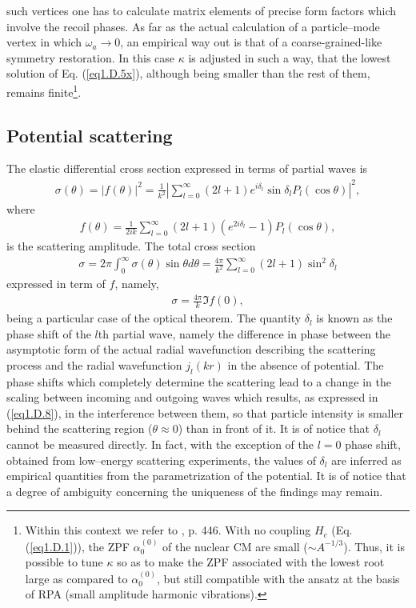 \begin{subappendices}
such vertices one has to calculate matrix elements of precise form factors which involve the recoil phases. As far as the actual calculation of a particle--mode vertex in which $\omega_a\rightarrow 0$, an empirical
way out is that of a coarse-grained-like symmetry restoration.
In this case $\kappa$ is adjusted in such a way, that the lowest solution of Eq. (\ref{eq1.D.5x}), although
being smaller than the  rest of them, remains finite\footnote{Within this context we refer to \cite{Bohr:75}, p. 446. With no coupling $H_c$ (Eq. (\ref{eq1.D.1})), the  ZPF $\alpha^{(0)}_0$ of the nuclear CM are small ($\sim A^{-1/3}$). Thus, it is possible to tune $\kappa$ so as to make the ZPF associated with the lowest root large as compared to $\alpha^{(0)}_0$, but still compatible with the ansatz at the basis of RPA (small amplitude harmonic vibrations).}.

\subsection{Potential scattering}
The elastic differential cross section expressed in terms of partial waves is
\begin{align}\label{eq1.D.5}
\sigma(\theta)=|f(\theta)|^2=\frac{1}{k^2}\left|\sum_{l=0}^\infty(2l+1)e^{i\delta_l}\sin\delta_lP_l(\cos\theta)\right|^2,
\end{align}
where
\begin{align}\label{eq1.D.6}
f(\theta)=\frac{1}{2ik}\sum_{l=0}^\infty(2l+1)\left(e^{2i\delta_l}-1\right) P_l(\cos\theta),
\end{align}
is the scattering amplitude. The total cross section 
\begin{align}\label{eq1.D.7}
\sigma=2\pi\int_0^\infty\sigma(\theta)\sin\theta d\theta=\frac{4\pi}{k^2}\sum_{l=0}^\infty(2l+1)\sin^2\delta_l
\end{align}
expressed in term of $f$, namely,
\begin{align}\label{eq1.D.8}
\sigma=\frac{4\pi}{k}\Im f(0),
\end{align}
being a particular case of the optical theorem. The quantity $\delta_l$ is known as the phase shift of the $l$th partial wave, namely the difference in phase between the asymptotic form of the actual radial wavefunction describing the scattering process and the radial wavefunction $j_l(kr)$ in the absence of potential. The phase shifts which completely determine the scattering lead to a change in the scaling between incoming and outgoing waves which results, as expressed in (\ref{eq1.D.8}), in the interference between them, so that particle intensity is smaller behind the scattering region ($\theta\approx0$) than in front of it. It is of notice that $\delta_l$ cannot be measured directly. In fact, with the exception of the $l=0$ phase shift, obtained from low--energy scattering experiments, the values of $\delta_l$ are inferred as empirical quantities from the parametrization of the potential. It is of notice that a degree of ambiguity concerning the uniqueness of the findings may remain.

\end{subappendices}
